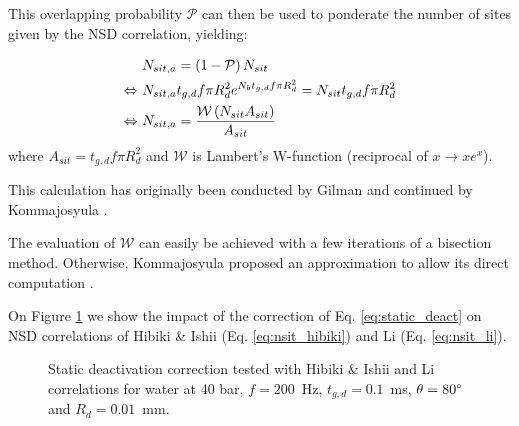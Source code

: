 This overlapping probability $\mathcal{P}$ can then be used to ponderate the number of sites given by the NSD correlation, yielding:

\begin{align}
&N_{sit,a}=\parth{1-\mathcal{P}}N_{sit} \\
%
\Leftrightarrow\  &N_{sit,a}t_{g,d}f\pi R_{d}^{2}e^{N_{b}t_{g,d}f \pi R_{d}^{2}}= N_{sit}t_{g,d}f \pi R_{d}^{2} \\
%
\Leftrightarrow\   &N_{sit,a} = \frac{\mathcal{W}\parth{N_{sit}{A_{sit}}}}{{A_{sit}}}
\label{eq:static_deact}
\end{align}
where $A_{sit}=t_{g,d}f \pi R_{d}^{2}$ and $\mathcal{W}$ is Lambert's W-function (reciprocal of $x \rightarrow xe^{x}$).

\begin{note*}{}
This calculation has originally been conducted by Gilman \cite{gilman_self-consistent_2017} and continued by Kommajosyula \cite{kommajosyula_development_2020}. 
\end{note*}

The evaluation of $\mathcal{W}$ can easily be achieved with a few iterations of a bisection method. Otherwise, Kommajosyula proposed an approximation to allow its direct computation \cite{kommajosyula_development_2020}.



\npar

On Figure \ref{fig:nsit_CSR} we show the impact of the correction of Eq. \ref{eq:static_deact} on NSD correlations of Hibiki \& Ishii (Eq. \ref{eq:nsit_hibiki}) and Li \etal (Eq. \ref{eq:nsit_li}).


\begin{figure}
\centering
{}
\caption{Static deactivation correction tested with Hibiki \& Ishii and Li \etal correlations for water at 40 bar, $f=200$~Hz, $t_{g,d} = 0.1$~ms, $\theta=80\degree$ and $R_{d} = 0.01$~mm.}
\label{fig:nsit_CSR}
\end{figure}


